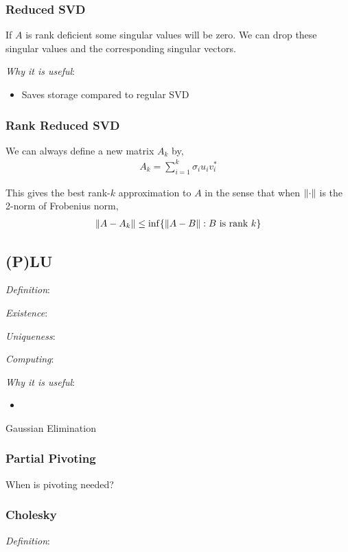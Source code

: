 \documentclass[12pt]{article}
\begin{document}
\subsubsection{Reduced SVD}
If \( A \) is rank deficient some singular values will be zero. We can drop these singular values and the corresponding singular vectors.

\textit{Why it is useful}:
\begin{itemize}[nolistsep]
    \item Saves storage compared to regular SVD
\end{itemize}

\subsubsection{Rank Reduced SVD}
We can always define a new matrix \( A_k \) by,
\begin{align*}
    A_k = \sum_{i=1}^{k} \sigma_i u_iv_i^*
\end{align*}

This gives the best rank-\( k \) approximation to \( A \) in the sense that when \( \left\lVert\cdot\right\rVert \) is the 2-norm of Frobenius norm,
\begin{align*}
    \left\lVert A-A_k\right\rVert \leq \operatorname{inf} \{ \left\lVert A-B\right\rVert : B\text{ is rank } k \}
\end{align*}



\subsection{(P)LU}
\textit{Definition}:

\textit{Existence}:

\textit{Uniqueness}:

\textit{Computing}:

\textit{Why it is useful}:
\begin{itemize}[nolistsep]
    \item 
\end{itemize}

Gaussian Elimination 

\subsubsection{Partial Pivoting}

When is pivoting needed?

\subsubsection{Cholesky}
\label{sec:cholesky}
\textit{Definition}:
\end{document}
